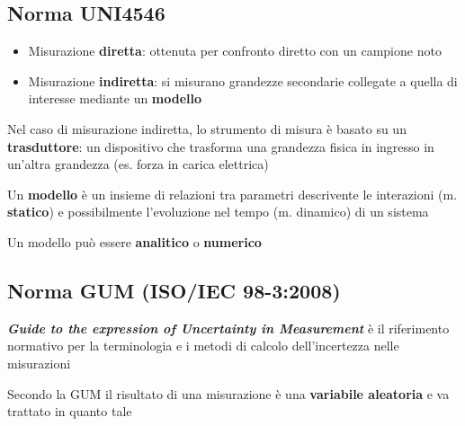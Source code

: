 \documentclass[
  letterpaper,
  DIV=11,
  numbers=noendperiod,
  oneside]{scrartcl}
\providecommand{\tightlist}{%
  \setlength{\itemsep}{0pt}\setlength{\parskip}{0pt}}
\begin{document}

\subsection{Norma UNI4546}\label{norma-uni4546-2}

\begin{itemize}
\tightlist
\item
  Misurazione \textbf{diretta}: ottenuta per confronto diretto con un
  campione noto
\item
  Misurazione \textbf{indiretta}: si misurano grandezze secondarie
  collegate a quella di interesse mediante un \textbf{modello}
\end{itemize}

Nel caso di misurazione indiretta, lo strumento di misura è basato su un
\textbf{trasduttore}: un dispositivo che trasforma una grandezza fisica
in ingresso in un'altra grandezza (es. forza in carica elettrica)

Un \textbf{modello} è un insieme di relazioni tra parametri descrivente
le interazioni (m. \textbf{statico}) e possibilmente l'evoluzione nel
tempo (m. {dinamico}) di un sistema

Un modello può essere \textbf{analitico} o \textbf{numerico}


\subsection{Norma GUM (ISO/IEC
98-3:2008)}\label{norma-gum-isoiec-98-32008}

\textbf{\emph{Guide to the expression of Uncertainty in Measurement}} è
il riferimento normativo per la terminologia e i metodi di calcolo
dell'incertezza nelle misurazioni

Secondo la GUM il risultato di una misurazione è una \textbf{variabile
aleatoria} e va trattato in quanto tale
\end{document}
